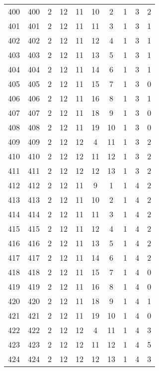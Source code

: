 \begin{longtable}{cccccccccc}
  400 & 400 &   2 &  12 &  11 &  10 &   2 &   1 &   3 &   2 \\ 
  401 & 401 &   2 &  12 &  11 &  11 &   3 &   1 &   3 &   1 \\ 
  402 & 402 &   2 &  12 &  11 &  12 &   4 &   1 &   3 &   1 \\ 
  403 & 403 &   2 &  12 &  11 &  13 &   5 &   1 &   3 &   1 \\ 
  404 & 404 &   2 &  12 &  11 &  14 &   6 &   1 &   3 &   1 \\ 
  405 & 405 &   2 &  12 &  11 &  15 &   7 &   1 &   3 &   0 \\ 
  406 & 406 &   2 &  12 &  11 &  16 &   8 &   1 &   3 &   1 \\ 
  407 & 407 &   2 &  12 &  11 &  18 &   9 &   1 &   3 &   0 \\ 
  408 & 408 &   2 &  12 &  11 &  19 &  10 &   1 &   3 &   0 \\ 
  409 & 409 &   2 &  12 &  12 &   4 &  11 &   1 &   3 &   2 \\ 
  410 & 410 &   2 &  12 &  12 &  11 &  12 &   1 &   3 &   2 \\ 
  411 & 411 &   2 &  12 &  12 &  12 &  13 &   1 &   3 &   2 \\ 
  412 & 412 &   2 &  12 &  11 &   9 &   1 &   1 &   4 &   2 \\ 
  413 & 413 &   2 &  12 &  11 &  10 &   2 &   1 &   4 &   2 \\ 
  414 & 414 &   2 &  12 &  11 &  11 &   3 &   1 &   4 &   2 \\ 
  415 & 415 &   2 &  12 &  11 &  12 &   4 &   1 &   4 &   2 \\ 
  416 & 416 &   2 &  12 &  11 &  13 &   5 &   1 &   4 &   2 \\ 
  417 & 417 &   2 &  12 &  11 &  14 &   6 &   1 &   4 &   2 \\ 
  418 & 418 &   2 &  12 &  11 &  15 &   7 &   1 &   4 &   0 \\ 
  419 & 419 &   2 &  12 &  11 &  16 &   8 &   1 &   4 &   0 \\ 
  420 & 420 &   2 &  12 &  11 &  18 &   9 &   1 &   4 &   1 \\ 
  421 & 421 &   2 &  12 &  11 &  19 &  10 &   1 &   4 &   0 \\ 
  422 & 422 &   2 &  12 &  12 &   4 &  11 &   1 &   4 &   3 \\ 
  423 & 423 &   2 &  12 &  12 &  11 &  12 &   1 &   4 &   5 \\ 
  424 & 424 &   2 &  12 &  12 &  12 &  13 &   1 &   4 &   3 \\ 

\end{longtable}
